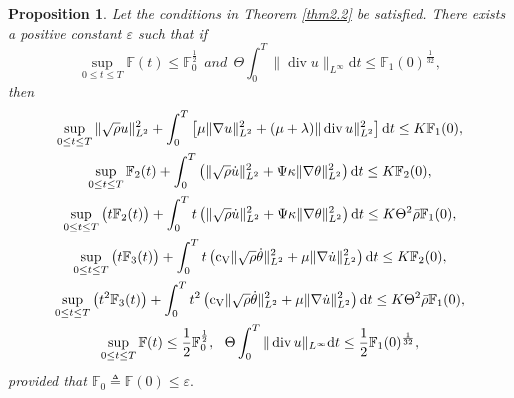 \documentclass[11pt]{article}
\newtheorem{Proposition}{Proposition}[section]
\DeclareMathOperator{\divv}{div}
\begin{document}
\begin{Proposition}\label{pro5.1}
Let the conditions in Theorem \ref{thm2.2} be satisfied.
There exists a positive constant $\varepsilon$ such that if
\begin{equation}\label{5.1}
\sup_{0 \leq t \leq T} \mathbb{F} (t) \leq \mathbb{F}_0^{\frac{1}{2}} \ \ and \ \ \Theta \int^T_0 \| \divv u\|_{L^{\infty}} \mathrm{d} t \leq \mathbb{F}_1 (0)^{\frac{1}{32}},
\end{equation}
then
\begin{gather}\label{5.2}
\sup_{0 \leq t \leq T} \|\sqrt{\rho} u\|_{L^2}^2 + \int^T_0 \left[ \mu \|\nabla u\|_{L^2}^2 + (\mu + \lambda ) \|\divv u\|_{L^2}^2 \right] \mathrm{d} t \leq K \mathbb{F}_1 (0),
\\ \label{5.3}
\sup_{0 \leq t \leq T} \mathbb{F}_2 (t) + \int^T_0 \left(\|\sqrt{\rho} \dot{u}\|_{L^2}^2 + \Psi \kappa \|\nabla \theta \|_{L^2}^2 \right) \mathrm{d} t \leq K \mathbb{F}_2 (0),
\\ \label{5.4}
\sup_{0 \leq t \leq T}\big(t \mathbb{F}_2 (t)\big)+ \int^T_0 t \left(\|\sqrt{\rho} \dot{u}\|_{L^2}^2 + \Psi \kappa \|\nabla \theta \|_{L^2}^2 \right) \mathrm{d} t \leq K \Theta^2 \bar{\rho} \mathbb{F}_1 (0),
\\ \label{5.5}
\sup_{0 \leq t \leq T}\big(t \mathbb{F}_3 (t)\big)+ \int^T_0 t \left({\rm c_V} \|\sqrt{\rho} \dot{\theta}\|_{L^2}^2 + \mu \|\nabla \dot{u} \|_{L^2}^2 \right) \mathrm{d} t \leq K \mathbb{F}_2 (0),
\\ \label{5.6}
\sup_{0 \leq t \leq T}\big(t^2 \mathbb{F}_3 (t)\big)+ \int^T_0 t^2 \left({\rm c_V} \|\sqrt{\rho} \dot{\theta}\|_{L^2}^2 + \mu \|\nabla \dot{u} \|_{L^2}^2 \right) \mathrm{d} t \leq K \Theta^2 \bar{\rho} \mathbb{F}_1 (0),\\ \label{5.7}
\sup_{0 \leq t \leq T} \mathbb{F} (t) \leq \frac{1}{2} \mathbb{F}_0^{\frac{1}{2}},\ \ \Theta \int^T_0 \|\divv u\|_{L^{\infty}} \mathrm{d} t \leq \frac{1}{2} \mathbb{F}_1 (0)^{\frac{1}{32}},
\end{gather}
provided that $\mathbb{F}_0 \triangleq \mathbb{F}(0) \leq \varepsilon.$
\end{Proposition}
\end{document}
